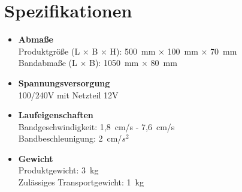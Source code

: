 %
%

\chapter{Spezifikationen}
\label{sec:Spezifikationen}

\begin{itemize}
	
	\item \textbf{Abmaße} \\
	Produktgröße (L × B × H):
	500 mm × 100 mm × 70 mm\\
	Bandabmaße (L × B):
	1050 mm × 80 mm
	
	\item \textbf{Spannungsversorgung} \\
	100/240V mit Netzteil 12V
	
	\item \textbf{Laufeigenschaften} \\
	Bandgeschwindigkeit:	1,8 cm/s - 7,6 cm/s\\
	Bandbeschleunigung:		2 cm/$s^2$
	
	\item \textbf{Gewicht} \\
	Produktgewicht: 3 kg\\
	Zulässiges Transportgewicht: 1 kg

\end{itemize}




